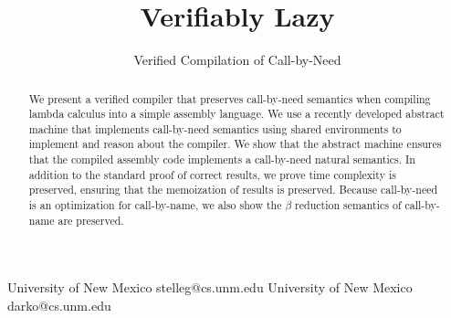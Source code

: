 \documentclass[preprint]{sigplanconf}
\begin{document}
\copyrightdata{[to be supplied]} 


\title{Verifiably Lazy}
\subtitle{Verified Compilation of Call-by-Need}

           {University of New Mexico}
           {stelleg@cs.unm.edu}
           {University of New Mexico}
           {darko@cs.unm.edu}
\maketitle

\begin{abstract}
We present a verified compiler that preserves call-by-need semantics when
compiling lambda calculus into a simple assembly language. We use a recently
developed abstract machine that implements call-by-need semantics using shared
environments to implement and reason about the compiler. We show that the
abstract machine ensures that the compiled assembly code implements a
call-by-need natural semantics. In addition to the standard proof of correct
results, we prove time complexity is preserved, ensuring that the memoization
of results is preserved. Because call-by-need is an optimization for
call-by-name, we also show the $\beta$ reduction semantics of call-by-name are
preserved.
\end{abstract}












\end{document}
